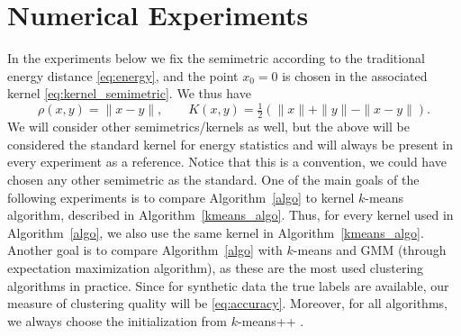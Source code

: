 \documentclass[aps,preprint,nofootinbib,floatfix]{revtex4-1}
\newcommand\kk{K}
\begin{document}
\section{Numerical Experiments}
\label{sec:numerics}

In the experiments below we fix the semimetric 
according to the traditional energy distance \eqref{eq:energy}, and
the point $x_0=0$ is chosen in the associated kernel  
\eqref{eq:kernel_semimetric}. We thus have
\begin{equation}
\label{eq:standard_metric}
\rho(x,y) = \| x-y\|, \qquad \kk(x,y) = 
\tfrac{1}{2}\left( \| x \| + \| y \| - \| x-y \| \right).
\end{equation}
We will consider other semimetrics/kernels as well, 
but the above will be considered the
standard kernel for energy statistics and will always be present in every
experiment as a reference. Notice that this is a convention, 
we could have chosen
any other semimetric as the standard.
One of the main goals of the following 
experiments is to compare Algorithm~\ref{algo} to
kernel $k$-means algorithm, described in Algorithm~\ref{kmeans_algo}. Thus,
for every kernel used in Algorithm~\ref{algo}, we also use the same 
kernel in Algorithm~\ref{kmeans_algo}. Another goal is to compare
Algorithm~\ref{algo} with $k$-means and GMM (through expectation maximization
algorithm), as these are the most used
clustering algorithms in practice.
Since for synthetic data the true labels are available,
our measure of clustering quality
will be \eqref{eq:accuracy}. Moreover, for all algorithms, we always
choose the initialization from $k$-means++ \cite{Vassilvitskii}.
\end{document}
